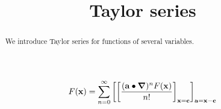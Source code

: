 \documentclass{ximera}
\title[Dig-In:]{Taylor series}
\begin{document}
\begin{abstract}
  We introduce Taylor series for functions of several variables.
\end{abstract}
\maketitle

\[
F(\mathbf{x}) = \sum_{n=0}^\infty \bigg[ \bigg[ \frac{(\mathbf{a}\bullet \boldsymbol\nabla)^n F(\mathbf{x})}{n!} \bigg]_{\mathbf{x}=\mathbf{c}} \bigg]_{\mathbf{a}=\mathbf{x}-\mathbf{c}}
\]
\end{document}
